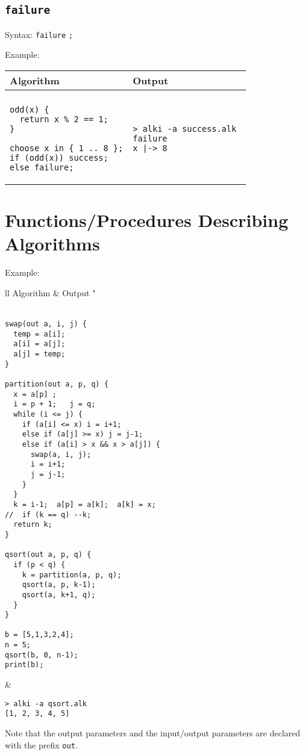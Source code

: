 \documentclass[a4paper]{report}
\begin{document}
\subsection{\texttt{failure}}

Syntax: \verb"failure" \verb";"

Example:
\begin{center}
\begin{tabular}{ll}
Algorithm & Output\\
\hline
\\
\begin{minipage}{.45\textwidth}
\begin{verbatim}
odd(x) {
  return x % 2 == 1;
}

choose x in { 1 .. 8 };
if (odd(x)) success;
else failure;
\end{verbatim}
\end{minipage}
&
\begin{minipage}{.45\textwidth}
\begin{verbatim}
> alki -a success.alk 
failure
x |-> 8
\end{verbatim}
\end{minipage}
\end{tabular}
\end{center}

\section{Functions/Procedures Describing Algorithms}

Example:
\begin{center}
\begin{tabular}{ll}
Algorithm & Output "\\
\hline
\\
\begin{minipage}{.55\textwidth}
\begin{verbatim}
swap(out a, i, j) {
  temp = a[i];
  a[i] = a[j];
  a[j] = temp;
}

partition(out a, p, q) {
  x = a[p] ; 
  i = p + 1;   j = q;
  while (i <= j) {
    if (a[i] <= x) i = i+1;
    else if (a[j] >= x) j = j-1;
    else if (a[i] > x && x > a[j]) {
      swap(a, i, j);
      i = i+1;
      j = j-1;
    }
  }
  k = i-1;  a[p] = a[k];  a[k] = x;
//  if (k == q) --k;
  return k;
}

qsort(out a, p, q) {
  if (p < q) {
    k = partition(a, p, q);
    qsort(a, p, k-1);
    qsort(a, k+1, q);
  }
}

b = [5,1,3,2,4];
n = 5;
qsort(b, 0, n-1);
print(b);
\end{verbatim}
\end{minipage}
&
\begin{minipage}{.42\textwidth}
\begin{verbatim}
> alki -a qsort.alk 
[1, 2, 3, 4, 5]
\end{verbatim}
\end{minipage}
\end{tabular}
\end{center}
Note that the output parameters and the input/output parameters are declared with the prefix {\tt out}.
\end{document}
